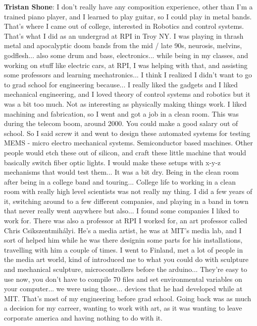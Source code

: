 \textbf{Tristan Shone}: I don't really have any composition experience, other than I'm a trained piano player, and I learned to play guitar, so I could play in metal bands. That's where I came out of college, interested in Robotics and control systems. That's what I did as an undergrad at RPI in Troy NY. I was playing in thrash metal and apocalyptic doom bands from the mid / late 90s, neurosis, melvins, godflesh... also some drum and bass, electronics... while being in my classes, and working on stuff like electric cars, at RPI, I was helping with that, and assisting some professors and learning mechatronics... I think I realized I didn't want to go to grad school for engineering because... I really liked the gadgets and I liked mechanical engineering, and I loved theory of control systems and robotics but it was a bit too much. Not as interesting as physically making things work. I liked machining and fabrication, so I went and got a job in a clean room. This was during the telecom boom, around 2000. You could make a good salary out of school. So I said screw it and went to design these automated systems for testing MEMS - micro electro mechanical systems. Semiconductor based machines. Other people would etch these out of silicon, and craft these little machine that would basically switch fiber optic lights. I would make these setups with x-y-z mechanisms that would test them... It was a bit dry. Being in the clean room after being in a college band and touring... College life to working in a clean room with really high level scientists was not really my thing. I did a few years of it, switching around to a few different companies, and playing in a band in town that never really went anywhere but also... I found some companies I liked to work for. There was also a professor at RPI I worked for, an art professor called Chris Csikszentmihályi. He's a media artist, he was at MIT's media lab, and I sort of helped him while he was there designin some parts for his installations, travelling with him a couple of times. I went to Finland, met a lot of people in the media art world, kind of introduced me to what you could do with sculpture and mechanical sculpture, microcontrollers before the arduino... They're easy to use now, you don't have to compile 70 files and set environmental variables on your computer... we were using those... devices that he had developed while at MIT. That's most of my engineering before grad school. Going back was as much a decision for my carreer, wanting to work with art, as it was wanting to leave corporate america and having nothing to do with it. 

